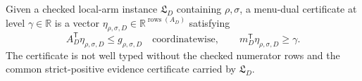 Given a checked local-arm instance \(\mathfrak L_D\) containing \(\rho,\sigma\), a menu-dual certificate at level \(\gamma\in\mathbb R\) is a vector \(\eta_{\rho,\sigma,D}\in\mathbb R^{\operatorname{rows}(A_D)}\) satisfying
\[
A_D^{\mathsf T}\eta_{\rho,\sigma,D}\le g_{\rho,\sigma,D}
\quad\text{coordinatewise},\qquad
m_D^{\mathsf T}\eta_{\rho,\sigma,D}\ge\gamma.
\]
The certificate is not well typed without the checked numerator rows and the common strict-positive evidence certificate carried by \(\mathfrak L_D\).